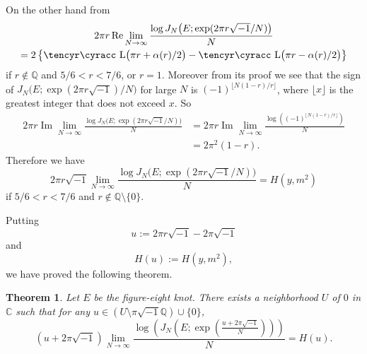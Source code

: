 \documentclass[a4paper]{amsart}
\def\cyr{\tencyr\cyracc}
\theoremstyle{plain}
\newtheorem{thm}{Theorem}[section]
\theoremstyle{definition}
\theoremstyle{remark}
\newcommand{\C}{\mathbb{C}}
\newcommand{\Q}{\mathbb{Q}}
\newcommand{\Lob}{\operatorname{\text{\cyr L}}}
\renewcommand{\Re}{\operatorname{Re}}
\renewcommand{\Im}{\operatorname{Im}}
\numberwithin{equation}{section}
\begin{document}
\par
On the other hand from \cite[Theorem 1.2]{Murakami:KYUMJ2004}
\begin{multline*}
  2\pi{r}\Re\lim_{N\to\infty}
  \frac{\log{J_N\bigl(E;\exp(2\pi{r}\sqrt{-1}/N)\bigr)}}{N}
  \\
  =
  2
  \left\{
    \Lob\bigl(\pi{r}+\alpha(r)/2\bigr)-\Lob\bigl(\pi{r}-\alpha(r)/2\bigr)
  \right\}
\end{multline*}
if $r\not\in\Q$ and $5/6<r<7/6$, or $r=1$.
Moreover from its proof we see that the sign of
$J_N\bigl(E;\exp(2\pi{r}\sqrt{-1})/N\bigr)$ for large $N$ is
$(-1)^{\lfloor{N(1-r)/r}\rfloor}$, where $\lfloor{x}\rfloor$ is the greatest
integer that does not exceed $x$.
So
\begin{equation*}
\begin{split}
  2\pi{r}\Im\lim_{N\to\infty}
  \frac{\log{J_N\bigl(E;\exp(2\pi{r}\sqrt{-1}/N)\bigr)}}{N}
  &=
  2\pi{r}\Im\lim_{N\to\infty}
  \frac{\log\left((-1)^{\lfloor{N(1-r)/r}\rfloor}\right)}{N}
  \\
  &=
  2\pi^2(1-r).
\end{split}
\end{equation*}
Therefore we have
\begin{equation*}
  2\pi{r}\sqrt{-1}\lim_{N\to\infty}
  \frac{\log{J_N\bigl(E;\exp(2\pi{r}\sqrt{-1}/N)\bigr)}}{N}
  =
  H(y,m^2)
\end{equation*}
if $5/6<r<7/6$ and $r\not\in\Q\setminus\{0\}$.
\par
Putting
\begin{equation*}
  u:=2\pi{r}\sqrt{-1}-2\pi\sqrt{-1}
\end{equation*}
and
\begin{equation*}
  H(u):=H(y,m^2),
\end{equation*}
we have proved the following theorem.
\begin{thm}
Let $E$ be the figure-eight knot.
There exists a neighborhood $U$ of $0$ in $\C$ such that for any
$u\in(U\setminus\pi\sqrt{-1}\Q)\cup\{0\}$,
\begin{equation*}
  (u+2\pi\sqrt{-1})
  \lim_{N\to\infty}
  \frac{\log\left(
              J_N\left(
                   E;\exp\left(\frac{u+2\pi\sqrt{-1}}{N}\right)
                 \right)
            \right)}
  {N}
  =H(u).
\end{equation*}
\end{thm}
\end{document}
